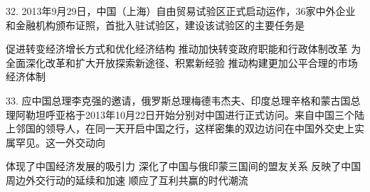 32. 2013年9月29日，中国（上海）自由贸易试验区正式启动运作，36家中外企业和金融机构颁布证照，首批入驻试验区，建设该试验区的主要任务是
\begin{choices}
	 促进转变经济增长方式和优化经济结构
	 推动加快转变政府职能和行政体制改革
	 为全面深化改革和扩大开放探索新途径、积累新经验
	 推动构建更加公平合理的市场经济体制
\end{choices}

33. 应中国总理李克强的邀请，俄罗斯总理梅德韦杰夫、印度总理辛格和蒙古国总理阿勒坦呼亚格于2013年10月22日开始分别对中国进行正式访问。来自中国三个陆上邻国的领导人，在同一天开启中国之行，这样密集的双边访问在中国外交史上实属罕见。这一外交动向
\begin{choices}
	 体现了中国经济发展的吸引力
	 深化了中国与俄印蒙三国间的盟友关系
	 反映了中国周边外交行动的延续和加速
	 顺应了互利共赢的时代潮流
\end{choices}